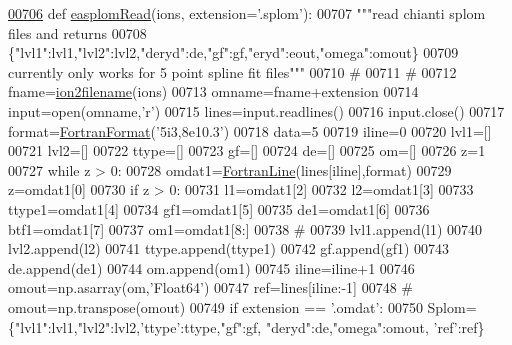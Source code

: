 \begin{DoxyCode}
\hypertarget{namespacepyneb_1_1utils_1_1__chianti__tools_l00706}{}\hyperlink{namespacepyneb_1_1utils_1_1__chianti__tools_aa36b22e4e67bccdea3436dcc05e7ba5b}{00706} \textcolor{keyword}{def }\hyperlink{namespacepyneb_1_1utils_1_1__chianti__tools_aa36b22e4e67bccdea3436dcc05e7ba5b}{easplomRead}(ions, extension='.splom'):
00707     \textcolor{stringliteral}{"""read chianti splom files and returns}
00708 \textcolor{stringliteral}{    \{"lvl1":lvl1,"lvl2":lvl2,"deryd":de,"gf":gf,"eryd":eout,"omega":omout\}}
00709 \textcolor{stringliteral}{    currently only works for 5 point spline fit files"""}
00710     \textcolor{comment}{#}
00711     \textcolor{comment}{#}
00712     fname=\hyperlink{namespacepyneb_1_1utils_1_1__chianti__tools_ad4bc7b577fd4c3819ceb00b0a444351b}{ion2filename}(ions)
00713     omname=fname+extension
00714     input=open(omname,\textcolor{stringliteral}{'}\textcolor{stringliteral}{r')}
00715 \textcolor{stringliteral}{    lines=input.readlines()}
00716 \textcolor{stringliteral}{    input.close()}
00717 \textcolor{stringliteral}{    format=\hyperlink{classpyneb_1_1utils_1_1_fortran_format_1_1_fortran_format}{FortranFormat}(}\textcolor{stringliteral}{'5i3,8e10.3'})
00718     data=5
00719     iline=0
00720     lvl1=[]
00721     lvl2=[]
00722     ttype=[]
00723     gf=[]
00724     de=[]
00725     om=[]
00726     z=1
00727     \textcolor{keywordflow}{while} z > 0:
00728         omdat1=\hyperlink{classpyneb_1_1utils_1_1_fortran_format_1_1_fortran_line}{FortranLine}(lines[iline],format)
00729         z=omdat1[0]
00730         \textcolor{keywordflow}{if} z > 0:
00731             l1=omdat1[2]
00732             l2=omdat1[3]
00733             ttype1=omdat1[4]
00734             gf1=omdat1[5]
00735             de1=omdat1[6]
00736             btf1=omdat1[7]
00737             om1=omdat1[8:]
00738             \textcolor{comment}{#}
00739             lvl1.append(l1)
00740             lvl2.append(l2)
00741             ttype.append(ttype1)
00742             gf.append(gf1)
00743             de.append(de1)
00744             om.append(om1)
00745         iline=iline+1
00746     omout=np.asarray(om,\textcolor{stringliteral}{'Float64'})
00747     ref=lines[iline:-1]
00748 \textcolor{comment}{#        omout=np.transpose(omout)}
00749     \textcolor{keywordflow}{if} extension == \textcolor{stringliteral}{'.omdat'}:
00750         Splom=\{\textcolor{stringliteral}{"lvl1"}:lvl1,\textcolor{stringliteral}{"lvl2"}:lvl2,\textcolor{stringliteral}{'ttype'}:ttype,\textcolor{stringliteral}{"gf"}:gf, \textcolor{stringliteral}{"deryd"}:de,\textcolor{stringliteral}{"omega"}:omout, \textcolor{stringliteral}{'ref'}:ref\}

\end{DoxyCode}
